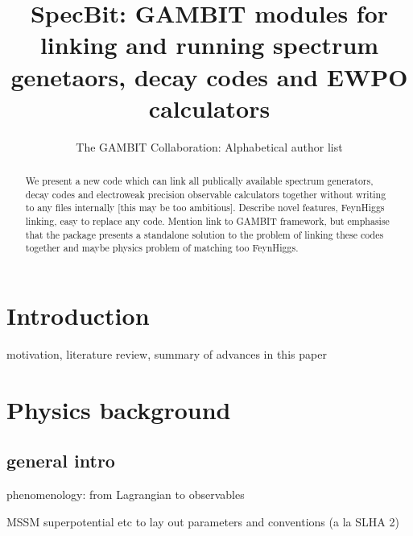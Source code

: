 \documentclass[11pt,a4paper]{article}
\title{SpecBit: GAMBIT modules for linking and running spectrum genetaors, decay codes and EWPO calculators}
\author{The GAMBIT Collaboration: Alphabetical author list} %
\begin{document}
\maketitle

\begin{abstract}
We present a new code which can link all publically available spectrum generators, decay codes and electroweak precision observable calculators together without writing to any files internally [this may be too ambitious]. Describe novel features, FeynHiggs linking, easy to replace any code. Mention link to GAMBIT framework, but emphasise that the package presents a standalone solution to the problem of linking these codes together and maybe physics problem of matching too FeynHiggs.
\end{abstract}

\tableofcontents


\section{Introduction}
motivation, literature review, summary of advances in this paper



\section{Physics background}


\subsection{general intro}

phenomenology: from Lagrangian to observables

MSSM superpotential etc to lay out parameters and conventions (a la SLHA 2)
\end{document}
